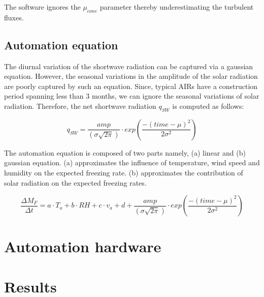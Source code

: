 \documentclass[utf8]{frontiersSCNS}
\begin{document}
The software ignores the $\mu_{cone}$ parameter thereby underestimating the turbulent fluxes.


\subsection{Automation equation}

The diurnal variation of the shortwave radiation can be captured via a gaussian equation. However, the seasonal
variations in the amplitude of the solar radiation are poorly captured by such an equation. Since, typical AIRs
have a construction period spanning less than 3 months, we can ignore the seasonal variations of solar
radiation. Therefore, the net shortwave radiation $q_{SW}$ is computed as follows: 

\begin{equation}
	q_{SW} = \frac{amp}{(\sigma \sqrt{2\pi})} \cdot exp\left(\frac{-(time-\mu)^2}{2\sigma^2}\right)
	\label{eqn:SW}
\end{equation}

The automation equation is composed of two parts namely, (a) linear and (b) gaussian equation. (a)
approximates the influence of temperature, wind speed and humidity on the expected freezing rate. (b)
approximates the contribution of solar radiation on the expected freezing rates. 

\begin{equation}
	\frac{\Delta M_{F}}{\Delta t} = a \cdot T_a + b \cdot RH + c \cdot v_a + d
  +\frac{amp}{(\sigma \sqrt{2\pi})} \cdot exp\left(\frac{-(time-\mu)^2}{2\sigma^2}\right)
	\label{eqn:auto}
\end{equation}

\section{Automation hardware}

\section{Results}
\end{document}
